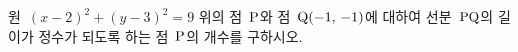 원~$(x-2)^2+(y-3)^2=9$ 위의 점~$\mathrm{P}$와 점~$\mathrm{Q}(-1,\,-1)$에 대하여 선분~$\mathrm{PQ}$의 길이가 정수가 되도록 하는 점~$\mathrm{P}$의 개수를 구하시오.

